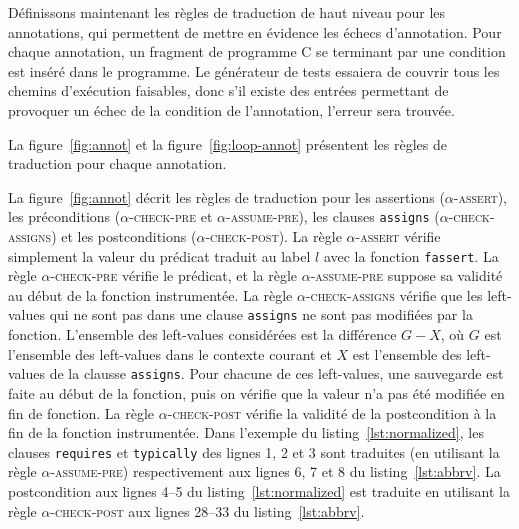 Définissons maintenant les règles de traduction de haut niveau pour les
annotations, qui permettent de mettre en évidence les échecs d'annotation.
Pour chaque annotation, un fragment de programme C se terminant par une
condition est inséré dans le programme.
Le générateur de tests essaiera de couvrir tous les chemins d'exécution
faisables, donc s'il existe des entrées permettant de provoquer un échec de la
condition de l'annotation, l'erreur sera trouvée.




La figure~\ref{fig:annot} et la figure~\ref{fig:loop-annot} présentent les
règles de traduction pour chaque annotation.

La figure~\ref{fig:annot} décrit les règles de traduction pour les assertions
(\textsc{$\alpha$-assert}), les préconditions (\textsc{$\alpha$-check-pre} et
\textsc{$\alpha$-assume-pre}), les clauses \lstinline'assigns'
(\textsc{$\alpha$-check-assigns}) et les postconditions
(\textsc{$\alpha$-check-post}).
La règle \textsc{$\alpha$-assert} vérifie simplement la valeur du prédicat
traduit au label $l$ avec la fonction \lstinline'fassert'.
La règle \textsc{$\alpha$-check-pre} vérifie le prédicat, et la règle
\textsc{$\alpha$-assume-pre} suppose sa validité au début de la fonction
instrumentée.
La règle \textsc{$\alpha$-check-assigns} vérifie que les left-values qui ne sont
pas dans une clause \lstinline'assigns' ne sont pas modifiées par la fonction.
L'ensemble des left-values considérées est la différence $G-X$, où $G$ est
l'ensemble des left-values dans le contexte courant et $X$ est l'ensemble des
left-values de la clausse \lstinline'assigns'.
Pour chacune de ces left-values, une sauvegarde est faite au début de la
fonction, puis on vérifie que la valeur n'a pas été modifiée en fin de fonction.
La règle \textsc{$\alpha$-check-post} vérifie la validité de la postcondition
à la fin de la fonction instrumentée.
Dans l'exemple du listing~\ref{lst:normalized}, les clauses \lstinline'requires'
et \lstinline'typically' des lignes 1, 2 et 3 sont traduites (en utilisant la
règle \textsc{$\alpha$-assume-pre}) respectivement aux lignes 6, 7 et 8 du
listing~\ref{lst:abbrv}.
La postcondition aux lignes 4--5 du listing~\ref{lst:normalized} est traduite
en utilisant la règle \textsc{$\alpha$-check-post} aux lignes 28--33 du
listing~\ref{lst:abbrv}.

